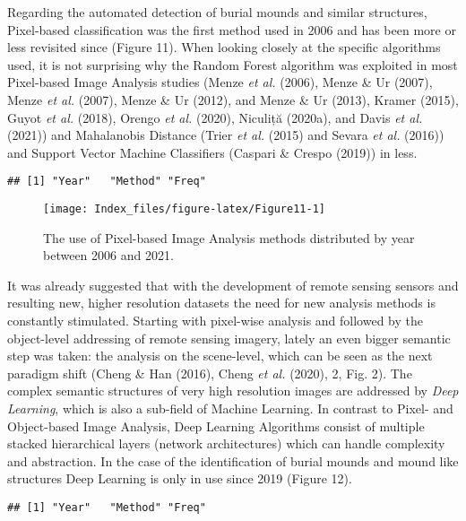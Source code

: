 \documentclass[
  12pt,
]{article}
\begin{document}
Regarding the automated detection of burial mounds and similar structures, Pixel-based classification was the first method used in 2006 and has been more or less revisited since (Figure 11). When looking closely at the specific algorithms used, it is not surprising why the Random Forest algorithm was exploited in most Pixel-based Image Analysis studies (Menze \emph{et al.} (2006), Menze \& Ur (2007), Menze \emph{et al.} (2007), Menze \& Ur (2012), and Menze \& Ur (2013), Kramer (2015), Guyot \emph{et al.} (2018), Orengo \emph{et al.} (2020), Niculiță (2020a), and Davis \emph{et al.} (2021)) and Mahalanobis Distance (Trier \emph{et al.} (2015) and Sevara \emph{et al.} (2016)) and Support Vector Machine Classifiers (Caspari \& Crespo (2019)) in less.

\begin{verbatim}
## [1] "Year"   "Method" "Freq"
\end{verbatim}

\begin{figure}

{\centering \texttt{[image: Index\_files/figure-latex/Figure11-1]} 

}

\caption{The use of Pixel-based Image Analysis methods distributed by year between 2006 and 2021.}\label{fig:Figure11}
\end{figure}

It was already suggested that with the development of remote sensing sensors and resulting new, higher resolution datasets the need for new analysis methods is constantly stimulated. Starting with pixel-wise analysis and followed by the object-level addressing of remote sensing imagery, lately an even bigger semantic step was taken: the analysis on the scene-level, which can be seen as the next paradigm shift (Cheng \& Han (2016), Cheng \emph{et al.} (2020), 2, Fig. 2). The complex semantic structures of very high resolution images are addressed by \emph{Deep Learning}, which is also a sub-field of Machine Learning. In contrast to Pixel- and Object-based Image Analysis, Deep Learning Algorithms consist of multiple stacked hierarchical layers (network architectures) which can handle complexity and abstraction.
In the case of the identification of burial mounds and mound like structures Deep Learning is only in use since 2019 (Figure 12).

\begin{verbatim}
## [1] "Year"   "Method" "Freq"
\end{verbatim}
\end{document}
